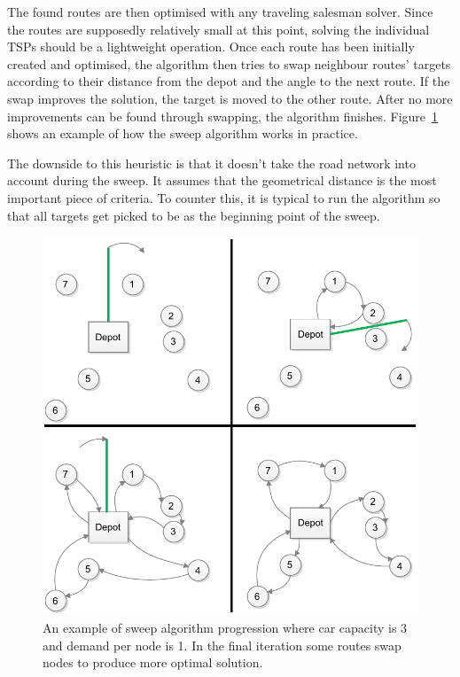 The found routes are then optimised with any traveling salesman solver. Since the routes are supposedly relatively small at this point, solving the individual TSPs should be a lightweight operation. Once each route has been initially created and optimised, the algorithm then tries to swap neighbour routes' targets according to their distance from the depot and the angle to the next route. If the swap improves the solution, the target is moved to the other route. After no more improvements can be found through swapping, the algorithm finishes. \cite{gillett1974heuristic} Figure~\ref{fig:sweep1} shows an example of how the sweep algorithm works in practice. 

The downside to this heuristic is that it doesn't take the road network into account during the sweep. It assumes that the geometrical distance is the most important piece of criteria. To counter this, it is typical to run the algorithm so that all targets get picked to be as the beginning point of the sweep. \cite{reimann2004d} 


\begin{figure}[h]
  \begin{center}
    \includegraphics{images/Sweep1.pdf}
    \caption{An example of sweep algorithm progression where car capacity is 3 and demand per node is 1. In the final iteration some routes swap nodes to produce more optimal solution.}
    \label{fig:sweep1}
  \end{center}
\end{figure}

